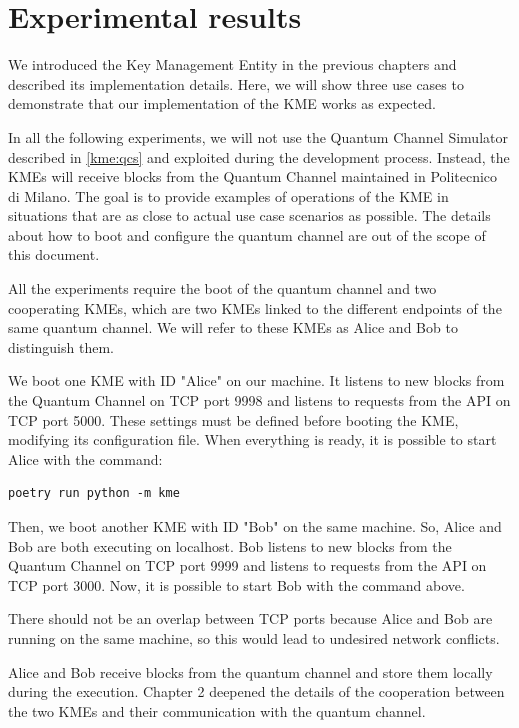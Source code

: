 \chapter{Experimental results}
\label{ch:chapter_4}%

We introduced the Key Management Entity in the previous chapters and described its implementation details. Here, we will show three use cases to demonstrate that our implementation of the KME works as expected.

In all the following experiments, we will not use the Quantum Channel Simulator described in \ref{kme:qcs} and exploited during the development process. Instead, the KMEs will receive blocks from the Quantum Channel maintained in Politecnico di Milano. The goal is to provide examples of operations of the KME in situations that are as close to actual use case scenarios as possible. The details about how to boot and configure the quantum channel are out of the scope of this document.

All the experiments require the boot of the quantum channel and two cooperating KMEs, which are two KMEs linked to the different endpoints of the same quantum channel. We will refer to these KMEs as Alice and Bob to distinguish them.

We boot one KME with ID "Alice" on our machine. It listens to new blocks from the Quantum Channel on TCP port 9998 and listens to requests from the API on TCP port 5000. These settings must be defined before booting the KME, modifying its configuration file. When  everything is ready, it is possible to start Alice with the command:

\begin{verbatim}
poetry run python -m kme
\end{verbatim}

Then, we boot another KME with ID "Bob" on the same machine. So, Alice and Bob are both executing on localhost. Bob listens to new blocks from the Quantum Channel on TCP port 9999 and listens to requests from the API on TCP port 3000. Now, it is possible to start Bob with the command above.

There should not be an overlap between TCP ports because Alice and Bob are running on the same machine, so this would lead to undesired network conflicts.

Alice and Bob receive blocks from the quantum channel and store them locally during the execution. Chapter 2 deepened the details of the cooperation between the two KMEs and their communication with the quantum channel.

